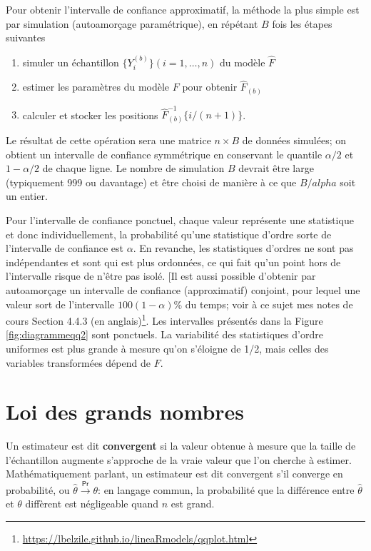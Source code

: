 \documentclass[
  11pt,
  letterpaper,
]{book}
\providecommand{\tightlist}{%
  \setlength{\itemsep}{0pt}\setlength{\parskip}{0pt}}
\renewcommand{\href}[2]{#2\footnote{\url{#1}}}
\theoremstyle{definition}
\theoremstyle{definition}
\theoremstyle{definition}
\theoremstyle{remark}
\begin{document}
Pour obtenir l'intervalle de confiance approximatif, la méthode la plus simple est par simulation (autoamorçage paramétrique), en répétant \(B\) fois les étapes suivantes

\begin{enumerate}
\def\labelenumi{\arabic{enumi}.}
\tightlist
\item
  simuler un échantillon \(\{Y^{(b)}_{i}\} (i=1,\ldots, n)\) du modèle \(\widehat{F}\)
\item
  estimer les paramètres du modèle \(F\) pour obtenir \(\widehat{F}_{(b)}\)
\item
  calculer et stocker les positions \(\widehat{F}^{-1}_{(b)}\{i/(n+1)\}\).
\end{enumerate}

Le résultat de cette opération sera une matrice \(n \times B\) de données simulées; on obtient un intervalle de confiance symmétrique en conservant le quantile \(\alpha/2\) et \(1-\alpha/2\) de chaque ligne. Le nombre de simulation \(B\) devrait être large (typiquement 999 ou davantage) et être choisi de manière à ce que \(B/alpha\) soit un entier.

Pour l'intervalle de confiance ponctuel, chaque valeur représente une statistique et donc individuellement, la probabilité qu'une statistique d'ordre sorte de l'intervalle de confiance est \(\alpha\). En revanche, les statistiques d'ordres ne sont pas indépendantes et sont qui est plus ordonnées, ce qui fait qu'un point hors de l'intervalle risque de n'être pas isolé. {[}Il est aussi possible d'obtenir par autoamorçage un intervalle de confiance (approximatif) conjoint, pour lequel une valeur sort de l'intervalle \(100(1-\alpha)\)\% du temps; \href{https://lbelzile.github.io/lineaRmodels/qqplot.html}{voir à ce sujet mes notes de cours Section 4.4.3 (en anglais)}. Les intervalles présentés dans la Figure \ref{fig:diagrammeqq2} sont ponctuels. La variabilité des statistiques d'ordre uniformes est plus grande à mesure qu'on s'éloigne de 1/2, mais celles des variables transformées dépend de \(F\).

\hypertarget{loi-grands-nombres}{%
\section{Loi des grands nombres}\label{loi-grands-nombres}}

Un estimateur est dit \textbf{convergent} si la valeur obtenue à mesure que la taille de l'échantillon augmente s'approche de la vraie valeur que l'on cherche à estimer. Mathématiquement parlant, un estimateur est dit convergent s'il converge en probabilité, ou \(\hat{\theta} \stackrel{\mathsf{Pr}}{\to} \theta\): en langage commun, la probabilité que la différence entre \(\hat{\theta}\) et \(\theta\) diffèrent est négligeable quand \(n\) est grand.
\end{document}
